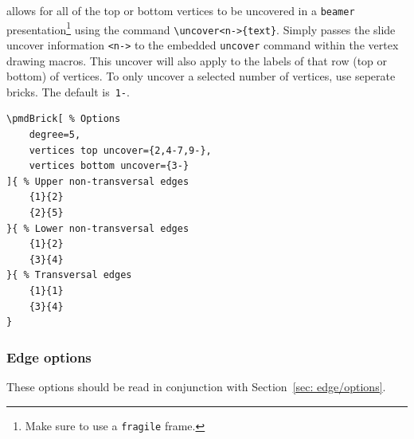 \documentclass{ltxdoc}
\begin{document}
allows for all of the top or bottom vertices to be uncovered in a \texttt{beamer} presentation\footnote{Make sure to use a \texttt{fragile} frame.} using the command \verb`\uncover<n->{text}`. Simply passes the slide uncover information \verb`<n->` to the embedded \texttt{uncover} command within the vertex drawing macros. This uncover will also apply to the labels of that row (top or bottom) of vertices. To only uncover a selected number of vertices, use seperate bricks. The default is~\texttt{1-}.
\begin{center}
    \begin{minipage}{\dimexpr0.85\textwidth-2\fboxrule-2\fboxsep\relax}
        \begin{minipage}[c]{0.4\linewidth}
\begin{verbatim}
\pmdBrick[ % Options
    degree=5,
    vertices top uncover={2,4-7,9-},
    vertices bottom uncover={3-}
]{ % Upper non-transversal edges
    {1}{2}
    {2}{5}
}{ % Lower non-transversal edges
    {1}{2}
    {3}{4}
}{ % Transversal edges
    {1}{1}
    {3}{4}
}
\end{verbatim}
        \end{minipage}
        \hfill
        \begin{minipage}[c]{0.4\linewidth}
        \end{minipage}
    \end{minipage}%
\end{center}


\subsubsection{Edge options}

These options should be read in conjunction with Section~\ref{sec: edge/options}.
\end{document}
